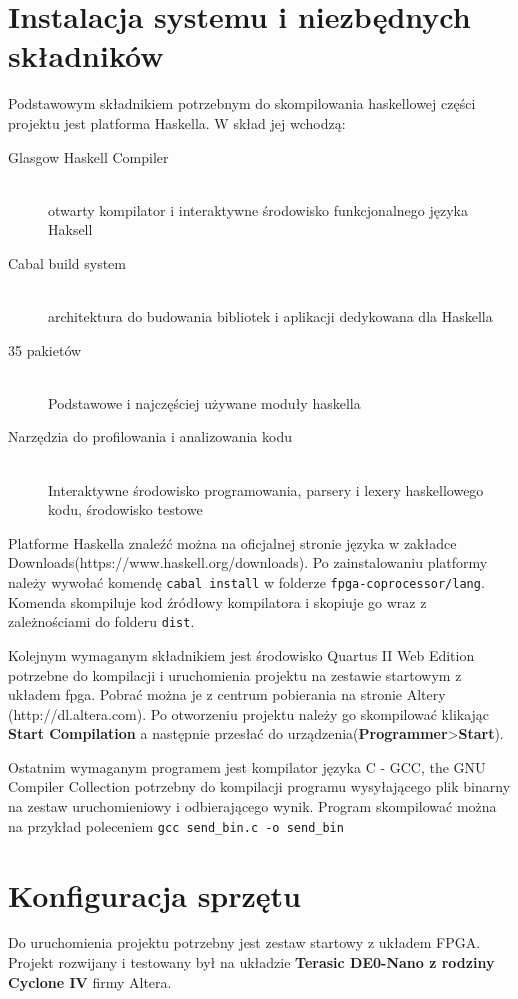 \section{Instalacja systemu i niezbędnych składników}
Podstawowym składnikiem potrzebnym do skompilowania haskellowej części projektu jest platforma Haskella. W skład jej wchodzą:
\begin{description}
  \item[Glasgow Haskell Compiler] \hfill \\
  otwarty kompilator i interaktywne środowisko funkcjonalnego języka Haksell 
  \item[Cabal build system] \hfill \\
  architektura do budowania bibliotek i aplikacji dedykowana dla Haskella
  \item[35 pakietów] \hfill \\
  Podstawowe i najczęściej używane moduły haskella
  \item[Narzędzia do profilowania i analizowania kodu] \hfill \\
  Interaktywne środowisko programowania, parsery i lexery haskellowego kodu, środowisko testowe
\end{description}

Platforme Haskella znaleźć można na oficjalnej stronie języka w zakładce Downloads(https://www.haskell.org/downloads).
Po zainstalowaniu platformy należy wywołać komendę \texttt{cabal install} w folderze \texttt{fpga-coprocessor/lang}. Komenda skompiluje kod źródłowy kompilatora i skopiuje go wraz z zależnościami do folderu \texttt{dist}.

Kolejnym wymaganym składnikiem jest środowisko Quartus II Web Edition potrzebne do kompilacji i uruchomienia projektu na zestawie startowym z układem fpga. Pobrać można je z centrum pobierania na stronie Altery (http://dl.altera.com).
Po otworzeniu projektu należy go skompilować klikając \textbf{Start Compilation} a następnie przesłać do urządzenia(\textbf{Programmer}\textgreater \textbf{Start}).

Ostatnim wymaganym programem jest kompilator języka C - GCC, the GNU Compiler Collection potrzebny do kompilacji programu wysyłającego plik binarny na zestaw uruchomieniowy i odbierającego wynik. Program skompilować można na przykład poleceniem 
\texttt{gcc send\_bin.c -o send\_bin}
\section{Konfiguracja sprzętu}
Do uruchomienia projektu potrzebny jest zestaw startowy z układem FPGA. Projekt rozwijany i testowany był na układzie \textbf{Terasic DE0-Nano z rodziny Cyclone IV} firmy Altera.

